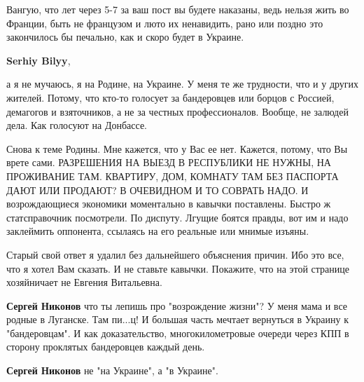 \begin{itemize}
\begin{itemize}
Вангую, что лет через 5-7 за ваш пост вы будете наказаны, ведь нельзя жить во
Франции, быть не французом и люто их ненавидить, рано или поздно это закончилось
бы печально, как и скоро будет в Украине.

 
\textbf{Serhiy Bilyy},

а я не мучаюсь, я на Родине, на Украине. У меня те же трудности, что и у других
жителей. Потому, что кто-то голосует за бандеровцев или борцов с Россией,
демагогов и взяточников, а не за честных профессионалов. Вообще, не залюдей
дела. Как голосуют на Донбассе. 

Снова к теме Родины. Мне кажется, что у Вас ее нет. Кажется, потому, что Вы
врете сами. РАЗРЕШЕНИЯ НА ВЫЕЗД В РЕСПУБЛИКИ НЕ НУЖНЫ, НА ПРОЖИВАНИЕ ТАМ.
КВАРТИРУ, ДОМ, КОМНАТУ ТАМ БЕЗ ПАСПОРТА ДАЮТ ИЛИ ПРОДАЮТ? В ОЧЕВИДНОМ И ТО
СОВРАТЬ НАДО. И возрождающиеся экономики моментально в кавычки поставлены.
Быстро ж статсправочник посмотрели. По диспуту. Лгущие боятся правды, вот им и
надо заклеймить оппонента, ссылаясь на его реальные или мнимые изъяны. 

Старый свой ответ я удалил без дальнейшего объяснения причин.  Ибо это все, что
я хотел Вам сказать. И не ставьте кавычки. Покажите, что на этой странице
хозяйничает не Евгения Витальевна.

 
\textbf{Сергей Никонов} что ты лепишь про "возрождение жизни"? У меня мама и все родные в Луганске. Там пи...ц! И большая часть мечтает вернуться в Украину к "бандеровцам". И как доказательство, многокилометровые очереди через КПП в сторону проклятых бандеровцев каждый день.

 
\textbf{Сергей Никонов} не "на Украине", а "в Украине".

 

\end{itemize}
\end{itemize}
